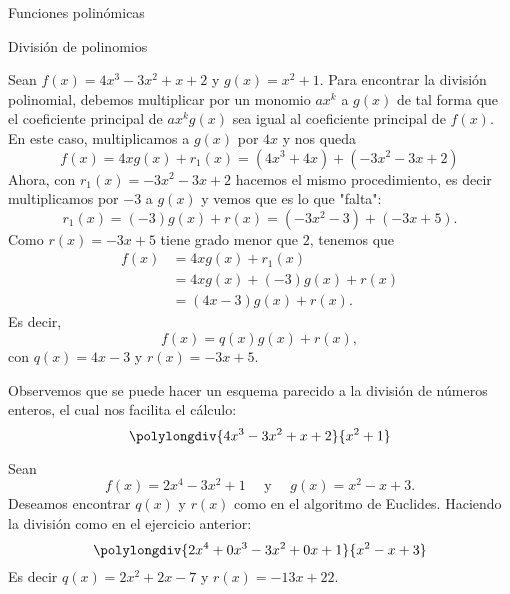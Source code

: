 \begin{chapter}{Funciones polinómicas}
\begin{section}{División de polinomios}
    \begin{ejemplo*} Sean $f(x) = 4x^3 - 3x^2 + x + 2$ y $g(x) = x^2 + 1$. Para encontrar la división polinomial, debemos multiplicar por un monomio $ax^k$ a $g(x)$ de tal forma que el coeficiente principal de  $ax^kg(x)$ sea igual al coeficiente principal de $f(x)$. En este caso, multiplicamos a $g(x)$ por $4x$ y nos queda
        \begin{equation*}
            f(x) = 4xg(x) + r_1(x) = (4x^3 +4x)+(-3x^2-3x +2)
        \end{equation*}
        Ahora,  con $r_1(x)=-3x^2-3x +2$ hacemos el mismo procedimiento,  es decir multiplicamos por $-3$  a $g(x)$ y vemos que es lo que "falta":
        \begin{equation*}
            r_1(x) = (-3)g(x) +r(x) = (-3x^2 -3) + (-3x+5).
        \end{equation*}
        Como $r(x) = -3x+5$ tiene grado menor que $2$, tenemos que
        \begin{align*}
            f(x) & = 4xg(x) + r_1(x) \\ &=4xg(x) + (-3)g(x) +r(x)\\& = (4x-3)g(x)+r(x).
        \end{align*}
        Es decir,
        \begin{equation*}
            f(x) = q(x)g(x)+r(x),
        \end{equation*}
        con $q(x) =4x-3$ y $r(x) = -3x+5$.

        Observemos que se puede hacer un esquema parecido a  la división de números enteros, el cual nos facilita el cálculo:
        \begin{equation*}
            \polylongdiv{4x^3 - 3x^2 + x + 2}{ x^2 + 1}
        \end{equation*}
    \end{ejemplo*}

    \begin{ejemplo*}
        Sean
        \begin{equation*}
            f (x) = 2x^4 - 3x^2 + 1 \quad \text{ y } \quad g (x) = x^2 - x + 3.
        \end{equation*}
        Deseamos encontrar $q (x)$ y $r (x)$ como en el algoritmo de Euclides. Haciendo la división como en el ejercicio anterior:
        \begin{equation*}
            \polylongdiv{2x^4 +0x^3- 3x^2 +0x+ 1}{x^2 - x + 3}
        \end{equation*}
        Es decir $q(x) = 2x^2+2x-7$ y $r(x)= -13x+22$.
    \end{ejemplo*}


\end{section}
\end{chapter}
